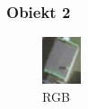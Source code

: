 \documentclass[a4paper,12pt]{article}  %
\begin{document}
\subsubsection{Obiekt 2}
\begin{figure}[H]
    \centering
    \begin{minipage}{0.24\textwidth}
        \centering
        \includegraphics[width=\linewidth]{spektralne/rgb_budynek0.png}
        \caption*{RGB}
    \end{minipage}
    \begin{minipage}{0.24\textwidth}
        \centering

\end{minipage}
\end{figure}
\end{document}
